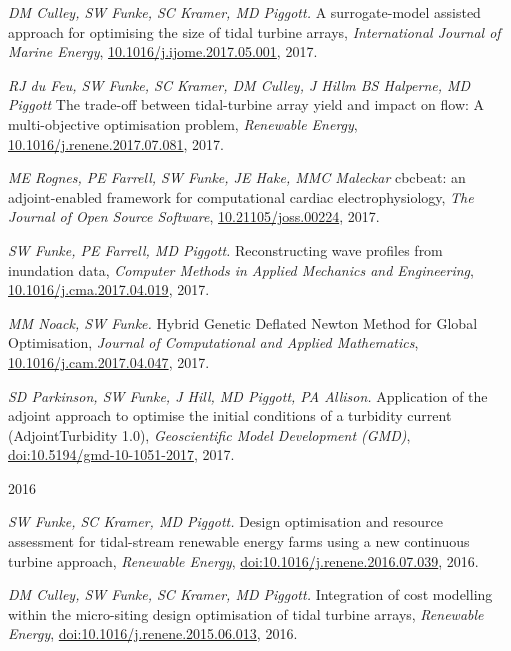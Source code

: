 \documentclass[11pt]{article}
\begin{document}
\begin{etaremune} 
\setcounter{enumi}{16}
    \item \textit{DM Culley, SW Funke, SC Kramer, MD Piggott.} A surrogate-model assisted approach for optimising the size of tidal turbine arrays, \textit{International Journal of Marine Energy}, \href{https://doi.org/10.1016/j.ijome.2017.05.001}{10.1016/j.ijome.2017.05.001}, 2017.
    \item \textit{RJ du Feu, SW Funke, SC Kramer, DM Culley, J Hillm BS Halperne, MD Piggott} The trade-off between tidal-turbine array yield and impact on flow: A multi-objective optimisation problem, \textit{Renewable Energy}, \href{https://doi.org/10.1016/j.renene.2017.07.081}{10.1016/j.renene.2017.07.081}, 2017.
    \item \textit{ME Rognes, PE Farrell, SW Funke, JE Hake, MMC Maleckar} cbcbeat: an adjoint-enabled framework for computational cardiac electrophysiology, \textit{The Journal of Open Source Software}, \href{http://dx.doi.org/10.21105/joss.00224}{10.21105/joss.00224}, 2017.
    \item \textit{SW Funke, PE Farrell, MD Piggott.} Reconstructing wave profiles from inundation data, \textit{Computer Methods in Applied Mechanics and Engineering}, \href{https://doi.org/10.1016/j.cma.2017.04.019}{10.1016/j.cma.2017.04.019}, 2017.
    \item \textit{MM Noack, SW Funke.} Hybrid Genetic Deflated Newton Method for Global Optimisation, \textit{Journal of Computational and Applied Mathematics}, \href{http://dx.doi.org/10.1016/j.cam.2017.04.047}{10.1016/j.cam.2017.04.047}, 2017.
    \item \textit{SD Parkinson, SW Funke, J Hill, MD Piggott, PA Allison.} Application of the adjoint approach to optimise the initial conditions of a turbidity current (AdjointTurbidity 1.0), \textit{Geoscientific Model Development (GMD)}, \href{https://dx.doi.org/10.5194/gmd-10-1051-2017}{doi:10.5194/gmd-10-1051-2017}, 2017.
\end{etaremune}
2016
\begin{etaremune}
\setcounter{enumi}{10}
    \item \textit{SW Funke, SC Kramer, MD Piggott.} Design optimisation and resource assessment for tidal-stream renewable energy farms using a new continuous turbine approach, \textit{Renewable Energy}, \href{https://dx.doi.org/10.1016/j.renene.2016.07.039}{doi:10.1016/j.renene.2016.07.039}, 2016.
    \item \textit{DM Culley, SW Funke, SC Kramer, MD Piggott.} Integration of cost modelling within the micro-siting design optimisation of tidal turbine arrays, \textit{Renewable Energy}, \href{https://doi.org/10.1016/j.renene.2015.06.013}{doi:10.1016/j.renene.2015.06.013}, 2016.
\end{etaremune}
\end{document}
